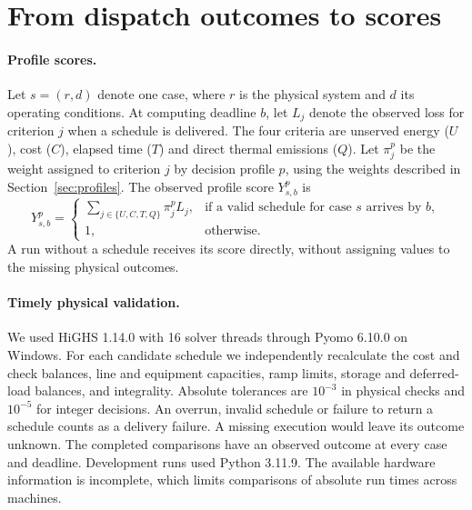 \documentclass[11pt,a4paper]{article}
\begin{document}
\appendix
\section{From dispatch outcomes to scores}
\label{app:scoring}

\paragraph{Profile scores.}
Let \(s=(r,d)\) denote one case, where \(r\) is the physical system and \(d\) its operating conditions. At computing deadline \(b\), let \(L_j\) denote the observed loss for criterion \(j\) when a schedule is delivered. The four criteria are unserved energy (\(U\)), cost (\(C\)), elapsed time (\(T\)) and direct thermal emissions (\(Q\)). Let \(\pi_j^p\) be the weight assigned to criterion \(j\) by decision profile \(p\), using the weights described in Section~\ref{sec:profiles}. The observed profile score \(Y^p_{s,b}\) is
\begin{equation}
 Y^p_{s,b} =
 \begin{cases}
 \displaystyle\sum_{j\in\{U,C,T,Q\}}\pi_j^p L_j, & \text{if a valid schedule for case \(s\) arrives by \(b\)},\\
 1, & \text{otherwise}.
 \end{cases}
 \label{eq:profileloss}
\end{equation}
A run without a schedule receives its score directly, without assigning values to the missing physical outcomes.

\paragraph{Timely physical validation.}
We used HiGHS 1.14.0 with 16 solver threads through Pyomo 6.10.0 on Windows. For each candidate schedule we independently recalculate the cost and check balances, line and equipment capacities, ramp limits, storage and deferred-load balances, and integrality. Absolute tolerances are \(10^{-3}\) in physical checks and \(10^{-5}\) for integer decisions. An overrun, invalid schedule or failure to return a schedule counts as a delivery failure. A missing execution would leave its outcome unknown. The completed comparisons have an observed outcome at every case and deadline. Development runs used Python 3.11.9. The available hardware information is incomplete, which limits comparisons of absolute run times across machines.
\end{document}
